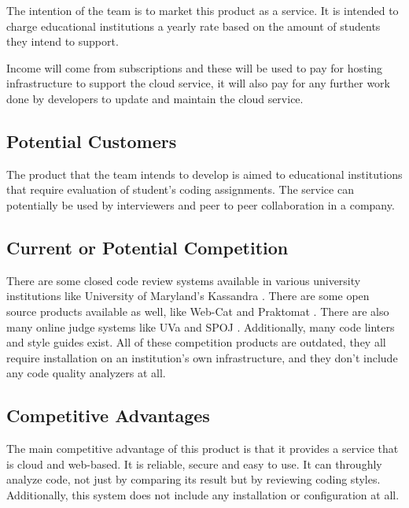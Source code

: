 
The intention of the team is to market this product as a service. It is intended to charge
educational institutions a yearly rate based on the amount of students they
intend to support.

Income will come from subscriptions and these will be used to pay for hosting
infrastructure to support the cloud service, it will also pay for any further
work done by developers to update and maintain the cloud service.

\subsection{Potential Customers}

The product that the team intends to develop is aimed to educational institutions that
require evaluation of student's coding assignments. The service can potentially
be used by interviewers and peer to peer collaboration in a company.

\subsection{Current or Potential Competition}

There are some closed code review systems available in various university
institutions like University of Maryland's Kassandra \cite{Matt1994}. There are
some open source products available as well, like Web-Cat \cite{WebCat} and
Praktomat \cite{Pracktomat}. There are also many online judge systems like UVa
\cite{UVA} and SPOJ \cite{SPOJ}. Additionally, many code linters and style
guides exist. All of these competition products are outdated, they all require
installation on an institution's own infrastructure, and they don't include any
code quality analyzers at all.

\subsection{Competitive Advantages}

The main competitive advantage of this product is that it provides a service that is cloud and
web-based. It is reliable, secure and easy to use. It can throughly analyze
code, not just by comparing its result but by reviewing coding styles.
Additionally, this system does not include any installation or configuration at
all.




